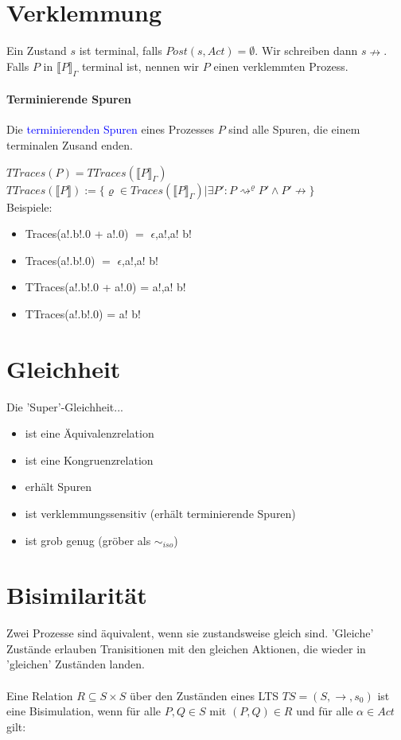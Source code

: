 \documentclass[a4paper,10pt, oneside]{book}
\begin{document}
\section{Verklemmung}
Ein Zustand $s$ ist terminal, falls $Post(s, Act) = \emptyset$. Wir schreiben dann $s \nrightarrow$. Falls $P$ in $\llbracket P \rrbracket_{\Gamma}$ terminal ist, nennen wir $P$ einen verklemmten Prozess.

\paragraph{Terminierende Spuren}
Die \textcolor{blue}{terminierenden Spuren} eines Prozesses $P$ sind alle Spuren, die einem terminalen Zusand enden.

 $TTraces(P) = TTraces(\llbracket P \rrbracket_{\Gamma})$\\
 $TTraces(\llbracket P \rrbracket) := \{\varrho \in Traces(\llbracket P \rrbracket_{\Gamma}) | \exists P':P \rightsquigarrow^{\varrho} P' \wedge P' \nrightarrow\}$
\\

Beispiele:
\begin{itemize}
 \item Traces(a!.b!.0 + a!.0) $=$ \textbraceleft $\epsilon$,a!,a! b!\textbraceright
 \item Traces(a!.b!.0) $=$ \textbraceleft $\epsilon$,a!,a! b!\textbraceright
 \item TTraces(a!.b!.0 + a!.0) = \textbraceleft a!,a! b!\textbraceright
 \item TTraces(a!.b!.0) = \textbraceleft a! b!\textbraceright
\end{itemize}

\section{Gleichheit}
Die 'Super'-Gleichheit...
\begin{itemize}
 \item ist eine Äquivalenzrelation
 \item ist eine Kongruenzrelation
 \item erhält Spuren
 \item ist verklemmungssensitiv (erhält terminierende Spuren)
 \item ist grob genug (gröber als $\sim_{iso}$)
\end{itemize}

\section{Bisimilarität}
Zwei Prozesse sind äquivalent, wenn sie zustandsweise gleich sind. 'Gleiche' Zustände erlauben Tranisitionen mit den gleichen Aktionen, die wieder in 'gleichen' Zuständen landen.\\
\\
Eine Relation $R \subseteq S \times S$ über den Zuständen eines LTS $TS = (S,\rightarrow,s_0)$ ist eine Bisimulation, wenn für alle $P,Q \in S$ mit $(P,Q) \in R$ und für alle $\alpha \in Act$ gilt:
\end{document}
